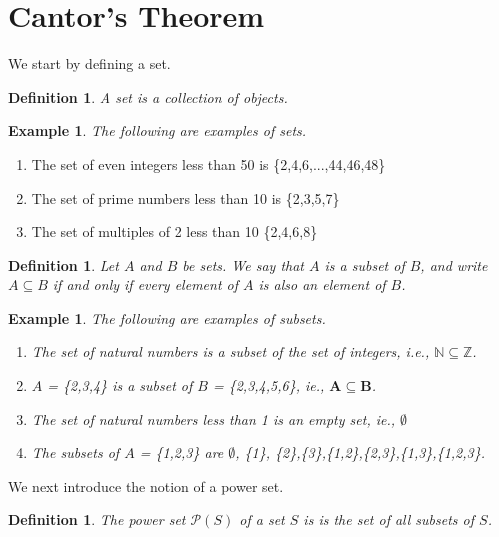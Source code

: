 \documentclass[12pt, a4paper]{article}
\theoremstyle{plain}
\newtheorem{definition}[theorem]{Definition}
\newtheorem{example}[theorem]{Example}
\begin{document}
\section{Cantor's Theorem}




We start by defining a set.

\begin{definition}\rm
A \textit{set} is a collection of objects.
\end{definition}

\begin{example} \rm The following are examples of sets.
\end{example}
\begin{enumerate}

    \item The set of even integers less than 50 is \{2,4,6,...,44,46,48\}
    \item The set of prime numbers less than 10 is \{2,3,5,7\} 
    \item The set of multiples of 2 less than 10 \{2,4,6,8\} 
\end{enumerate}

       


\begin{definition}\rm
Let $A$ and $B$ be sets. We say that $A$ is a \textit{subset} of $B$, and write $A
\subseteq B$ if and only if every element of $A$ is also an element of $B$. 
\end{definition}

\begin{example}\rm The following are examples of subsets.

\begin{enumerate}
    \item The set of natural numbers is a subset of the set of integers, i.e., $\mathbb{N}\subseteq \mathbb{Z}$.
    \item $A$ = \{2,3,4\} is a subset of $B$ = \{2,3,4,5,6\}, ie., $\mathbf{A}\subseteq \mathbf{B}$.
    \item The set of natural numbers less than 1 is an empty set, ie., $\emptyset$
    \item The subsets of $A$ = \{1,2,3\} are $\emptyset$, \{1\}, \{2\},\{3\},\{1,2\},\{2,3\},\{1,3\},\{1,2,3\}.
\end{enumerate}
\end{example}

We next introduce the notion of a power set.  
\begin{definition}\rm
The \textit{power set} $\mathcal{P}(S)$ of a set $S$ is is the set of all subsets of $S$.
\end{definition}
\end{document}

